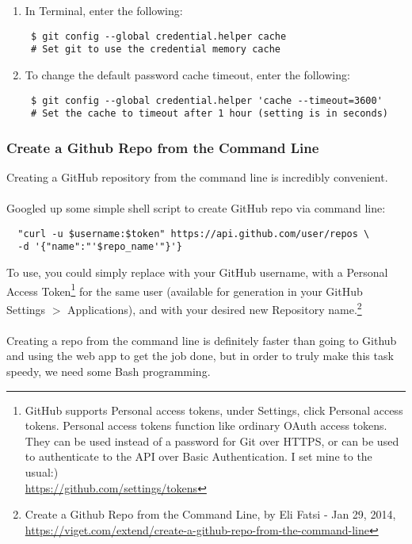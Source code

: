 \begin{enumerate}
  \item{In Terminal, enter the following:
\begin{Verbatim}
 $ git config --global credential.helper cache
 # Set git to use the credential memory cache
\end{Verbatim}
       }
  \item{To change the default password cache timeout, enter the following:
\begin{Verbatim}
 $ git config --global credential.helper 'cache --timeout=3600'
 # Set the cache to timeout after 1 hour (setting is in seconds)
\end{Verbatim}
       }
\end{enumerate}

\noindent {}

\subsubsection{Create a Github Repo from the Command Line}
Creating a GitHub repository from the command line is incredibly
convenient.
\\
\\
Googled up some simple shell script to create GitHub repo via
command line:

\begin{verbatim}
  "curl -u $username:$token" https://api.github.com/user/repos \
  -d '{"name":"'$repo_name'"}'}
\end{verbatim}

\noindent To use, you could simply replace  with your
GitHub username, \cmd{\$token} with a Personal Access Token\footnote{GitHub
supports Personal access tokens, under Settings, click Personal access
tokens. Personal access tokens function like ordinary OAuth access tokens.
They can be used instead of a password for Git over HTTPS, or can be used
to authenticate to the API over Basic Authentication.  I set mine to the usual:)\\
\href{https://github.com/settings/tokens}{https://github.com/settings/tokens}}
for the same user (available for generation in your GitHub\\
Settings $>$ Applications), and  with your
desired new Repository name.\footnote{Create a Github Repo
from the Command Line, by Eli Fatsi - Jan 29, 2014,\\
\href{https://viget.com/extend/create-a-github-repo-from-the-command-line}{https://viget.com/extend/create-a-github-repo-from-the-command-line}}
\\
\\
Creating a repo from the command line is definitely faster
than going to Github and using the web app to get the job
done, but in order to truly make this task speedy, we need
some Bash programming.


